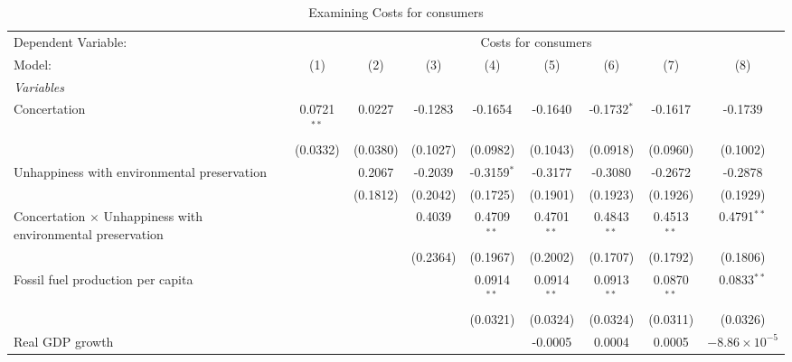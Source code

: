 
\begin{table}[htbp]
   \caption{Examining Costs for consumers}
   \centering
   \begin{tabular}{lcccccccc}
      \tabularnewline \midrule \midrule
      Dependent Variable: & \multicolumn{8}{c}{Costs for consumers}\\
      Model:                                                             & (1)           & (2)      & (3)      & (4)           & (5)           & (6)           & (7)           & (8)\\  
      \midrule
      \emph{Variables}\\
      Concertation                                                       & 0.0721$^{**}$ & 0.0227   & -0.1283  & -0.1654       & -0.1640       & -0.1732$^{*}$ & -0.1617       & -0.1739\\   
                                                                         & (0.0332)      & (0.0380) & (0.1027) & (0.0982)      & (0.1043)      & (0.0918)      & (0.0960)      & (0.1002)\\   
      Unhappiness with environmental preservation                        &               & 0.2067   & -0.2039  & -0.3159$^{*}$ & -0.3177       & -0.3080       & -0.2672       & -0.2878\\   
                                                                         &               & (0.1812) & (0.2042) & (0.1725)      & (0.1901)      & (0.1923)      & (0.1926)      & (0.1929)\\   
      Concertation $\times$ Unhappiness with environmental preservation  &               &          & 0.4039   & 0.4709$^{**}$ & 0.4701$^{**}$ & 0.4843$^{**}$ & 0.4513$^{**}$ & 0.4791$^{**}$\\   
                                                                         &               &          & (0.2364) & (0.1967)      & (0.2002)      & (0.1707)      & (0.1792)      & (0.1806)\\   
      Fossil fuel production per capita                                  &               &          &          & 0.0914$^{**}$ & 0.0914$^{**}$ & 0.0913$^{**}$ & 0.0870$^{**}$ & 0.0833$^{**}$\\   
                                                                         &               &          &          & (0.0321)      & (0.0324)      & (0.0324)      & (0.0311)      & (0.0326)\\   
      Real GDP growth                                                    &               &          &          &               & -0.0005       & 0.0004        & 0.0005        & $-8.86\times 10^{-5}$\\    

\end{tabular}
\end{table}
